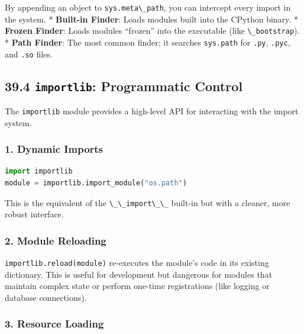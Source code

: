 By appending an object to \passthrough{\lstinline!sys.meta\_path!}, you
can intercept every import in the system. * \textbf{Built-in Finder}:
Loads modules built into the CPython binary. * \textbf{Frozen Finder}:
Loads modules ``frozen'' into the executable (like
\passthrough{\lstinline!\_bootstrap!}). * \textbf{Path Finder}: The most
common finder; it searches \passthrough{\lstinline!sys.path!} for
\passthrough{\lstinline!.py!}, \passthrough{\lstinline!.pyc!}, and
\passthrough{\lstinline!.so!} files.

\hypertarget{importlib-programmatic-control}{%
\subsection{\texorpdfstring{39.4 \texttt{importlib}: Programmatic
Control}{39.4 importlib: Programmatic Control}}\label{importlib-programmatic-control}}

The \passthrough{\lstinline!importlib!} module provides a high-level API
for interacting with the import system.

\hypertarget{dynamic-imports}{%
\subsubsection{1. Dynamic Imports}\label{dynamic-imports}}

\begin{lstlisting}[language=Python]
import importlib
module = importlib.import_module("os.path")
\end{lstlisting}

This is the equivalent of the \passthrough{\lstinline!\_\_import\_\_!}
built-in but with a cleaner, more robust interface.

\hypertarget{module-reloading}{%
\subsubsection{2. Module Reloading}\label{module-reloading}}

\passthrough{\lstinline!importlib.reload(module)!} re-executes the
module's code in its existing dictionary. This is useful for development
but dangerous for modules that maintain complex state or perform
one-time registrations (like logging or database connections).

\hypertarget{resource-loading}{%
\subsubsection{3. Resource Loading}\label{resource-loading}}

